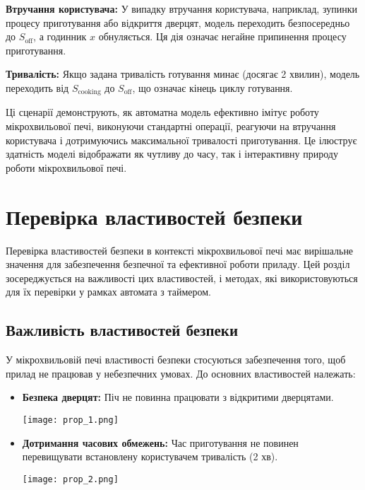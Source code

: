 \documentclass[12pt,a4paper]{article}
\begin{document}
\textbf{Втручання користувача:}
У випадку втручання користувача, наприклад, зупинки процесу приготування або відкриття дверцят, модель переходить безпосередньо до \( S_{\text{off}} \), а годинник \( x \) обнуляється. Ця дія означає негайне припинення процесу приготування.

\textbf{Тривалість:}
Якщо задана тривалість готування минає (досягає 2 хвилин), модель переходить від \( S_{\text{cooking}} \) до \( S_{\text{off}} \), що означає кінець циклу готування.

Ці сценарії демонструють, як автоматна модель ефективно імітує роботу мікрохвильової печі, виконуючи стандартні операції, реагуючи на втручання користувача і дотримуючись максимальної тривалості приготування. Це ілюструє здатність моделі відображати як чутливу до часу, так і інтерактивну природу роботи мікрохвильової печі.

\newpage

\section{Перевірка властивостей безпеки}

Перевірка властивостей безпеки в контексті мікрохвильової печі має вирішальне значення для забезпечення безпечної та ефективної роботи приладу. Цей розділ зосереджується на важливості цих властивостей, і методах, які використовуються для їх перевірки у рамках автомата з таймером.

\subsection{Важливість властивостей безпеки}

У мікрохвильовій печі властивості безпеки стосуються забезпечення того, щоб прилад не працював у небезпечних умовах. До основних властивостей належать:

\begin{itemize}
    \item \textbf{Безпека дверцят:} Піч не повинна працювати з відкритими дверцятами.

    \texttt{[image: prop\_1.png]}

    \vspace{0.5cm}

    \item \textbf{Дотримання часових обмежень:} Час приготування не повинен перевищувати встановлену користувачем тривалість (2 хв).

    \texttt{[image: prop\_2.png]}
\end{itemize}
\end{document}
